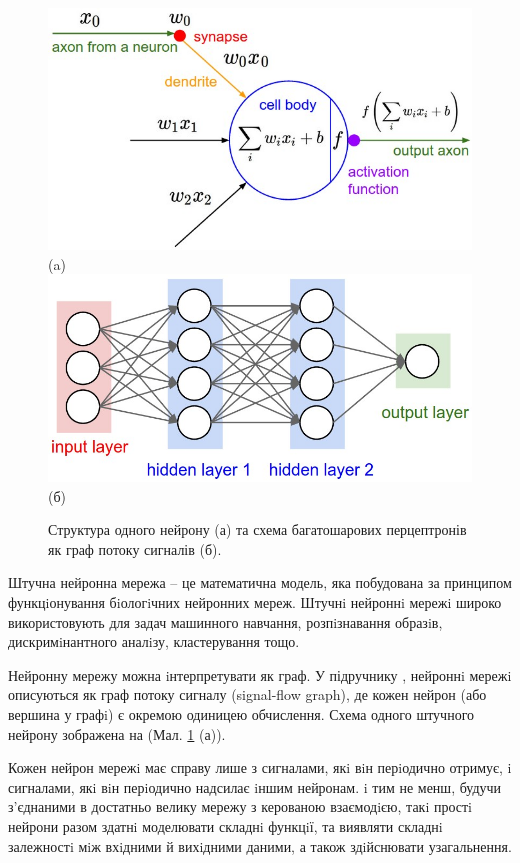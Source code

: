 \begin{figure}[b!]
	\centering	
	\includegraphics[width=0.90\linewidth]{Figures/Chapter4/neuron_model.jpeg}\\
	(a)
	\endminipage\hfill
	\centering	
	\includegraphics[width=0.90\linewidth]{Figures/Chapter4/neural_net2.jpeg}\\
	(б)
	\endminipage\hfill
	
	\caption{Структура одного нейрону (а) та схема багатошарових перцептронів як граф потоку сигналів (б).}
	\label{fig:neuralnet}
\end{figure}

Штучна нейронна мережа -- це математична модель, яка побудована за принципом функцiонування бiологiчних нейронних мереж. Штучнi нейроннi мережi широко використовують для задач машинного навчання, розпiзнавання образiв, дискримiнантного аналiзу, кластерування тощо. 

Нейронну мережу можна iнтерпретувати як граф. У підручнику \citep{book:haykin}, нейроннi мережi описуються як граф потоку сигналу (signal-flow graph), де кожен нейрон (або вершина у графi) є окремою одиницею обчислення. Схема одного штучного нейрону зображена на (Мал. \ref{fig:neuralnet} (а)).

Кожен нейрон мережi має справу лише з сигналами, якi вiн перiодично отримує, i сигналами, якi вiн перiодично надсилає iншим нейронам. i тим не менш, будучи з'єднаними в достатньо велику мережу з керованою взаємодiєю, такi простi нейрони разом здатнi моделювати складнi функцiї, та виявляти складнi залежностi мiж вхiдними й вихiдними даними, а також здiйснювати узагальнення.


